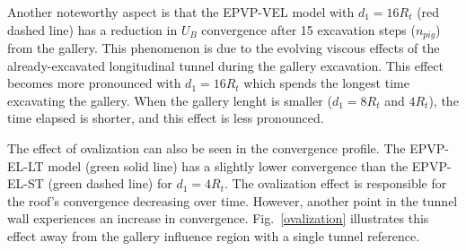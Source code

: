 \documentclass[a4paper,fleqn]{cas-sc}
\begin{document}
Another noteworthy aspect is that the EPVP-VEL model with $d_1 = 16R_t$ (red dashed line) has a reduction in $U_{B}$ convergence after 15 excavation steps ($n_{pig}$) from the gallery. This phenomenon is due to the evolving viscous effects of the already-excavated longitudinal tunnel during the gallery excavation. This effect becomes more pronounced with $d_1 = 16R_t$ which spends the longest time excavating the gallery. When the gallery lenght is smaller ($d_1 = 8R_t$ and $4R_t$), the time elapsed is shorter, and this effect is less pronounced.

The effect of ovalization can also be seen in the convergence profile. The EPVP-EL-LT model (green solid line) has a slightly lower convergence than the EPVP-EL-ST (green dashed line) for $d_1 = 4R_t$. The ovalization effect is responsible for the roof's convergence decreasing over time. However, another point in the tunnel wall experiences an increase in convergence. Fig.~\ref{ovalization} illustrates this effect away from the gallery influence region with a single tunnel reference.
\end{document}
